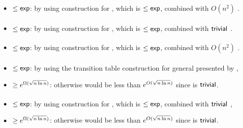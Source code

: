\paragraph{\OMOLA{}\tto\TDFA}
\begin{itemize}
	\item $\le\mathsf{exp}$: by using construction for \hyperref[cost:OM1LAto1NFAu]{\OMOLA{}\tto\ONFA}, which is $\le\mathsf{exp}$, combined with $O(n^2)$ \ONFA{}\tto\TDFA.
\end{itemize}
\paragraph{\OMOLA{}\tto\TNFA}
\begin{itemize}
	\item $\le\mathsf{exp}$: by using construction for \hyperref[cost:OM1LAto1NFAu]{\OMOLA{}\tto\ONFA}, which is $\le\mathsf{exp}$, combined with $\mathsf{trivial}$ \ONFA{}\tto\TNFA.
\end{itemize}
\paragraph{\OMOLA{}\tto\OMODLA}
\begin{itemize}
	\item $\le\mathsf{exp}$: by using construction for \hyperref[cost:OM1LAto1NFAu]{\OMOLA{}\tto\ONFA}, which is $\le\mathsf{exp}$, combined with $O(n^2)$ \hyperref[cost:1NFAtoOM1DLAu]{\ONFA{}\tto\OMODLA}.
\end{itemize}
\paragraph{\OMODLA{}\tto\ODFA}\label{cost:OM1DLAto1DFAu}
\begin{itemize}
	\item $\le\mathsf{exp}$: by using the transition table construction for general \ODLAs presented by ,
	\item $\ge e^{\Omega(\sqrt{n\ln n})}$: otherwise \hyperref[cost:2DFAto1DFAu]{\TDFA{}\tto\ODFA} would be less than $e^{O(\sqrt{n\ln n})}$ since \TDFA{}\tto\OMODLA is $\mathsf{trivial}$.
\end{itemize}
\paragraph{\OMODLA{}\tto\ONFA}
\begin{itemize}
	\item $\le\mathsf{exp}$: by using construction for \hyperref[cost:OM1DLAto1DFAu]{\OMODLA{}\tto\ODFA}, which is $\le\mathsf{exp}$, combined with $\mathsf{trivial}$ \ODFA{}\tto\ONFA,
	\item $\ge e^{\Omega(\sqrt{n\ln n})}$: otherwise \hyperref[cost:2DFAto1NFAu]{\TDFA{}\tto\ONFA} would be less than $e^{O(\sqrt{n\ln n})}$ since \TDFA{}\tto\OMODLA is $\mathsf{trivial}$.
\end{itemize}
